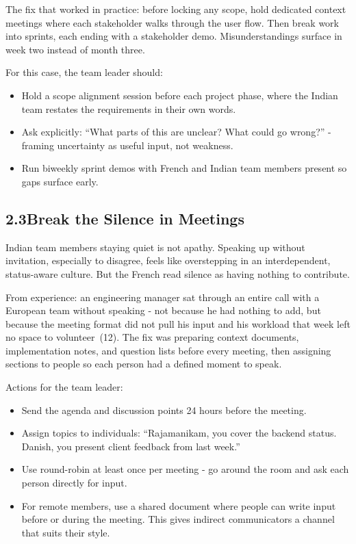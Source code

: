\documentclass[12pt, a4paper]{article}
\begin{document}
The fix that worked in practice: before locking any scope, hold dedicated context meetings where each stakeholder walks through the user flow. Then break work into sprints, each ending with a stakeholder demo. Misunderstandings surface in week two instead of month three.

For this case, the team leader should:
\begin{itemize}[noitemsep]
    \item Hold a scope alignment session before each project phase, where the Indian team restates the requirements in their own words.
    \item Ask explicitly: ``What parts of this are unclear? What could go wrong?'' - framing uncertainty as useful input, not weakness.
    \item Run biweekly sprint demos with French and Indian team members present so gaps surface early.
\end{itemize}

\subsection*{2.3\quad Break the Silence in Meetings}

Indian team members staying quiet is not apathy. Speaking up without invitation, especially to disagree, feels like overstepping in an interdependent, status-aware culture. But the French read silence as having nothing to contribute.

From experience: an engineering manager sat through an entire call with a European team without speaking - not because he had nothing to add, but because the meeting format did not pull his input and his workload that week left no space to volunteer~(12). The fix was preparing context documents, implementation notes, and question lists before every meeting, then assigning sections to people so each person had a defined moment to speak.

Actions for the team leader:
\begin{itemize}[noitemsep]
    \item Send the agenda and discussion points 24 hours before the meeting.
    \item Assign topics to individuals: ``Rajamanikam, you cover the backend status. Danish, you present client feedback from last week.''
    \item Use round-robin at least once per meeting - go around the room and ask each person directly for input.
    \item For remote members, use a shared document where people can write input before or during the meeting. This gives indirect communicators a channel that suits their style.
\end{itemize}
\end{document}

